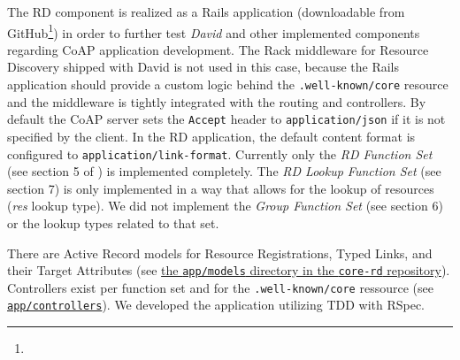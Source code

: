 	The \acl{RD} component is realized as a \ac{Rails} application
	(downloadable from GitHub\footnote{\urlCoreRd}) in order to further test
	\emph{David} and other implemented components regarding \ac{CoAP}
	application development. The Rack middleware for Resource Discovery shipped
	with David is not used in this case, because the \ac{Rails} application
	should provide a custom logic behind the \texttt{.well-known/core} resource
	and the middleware is tightly integrated with the routing and controllers.
	By default the \ac{CoAP} server sets the \texttt{Accept} header to
	\texttt{application/json} if it is not specified by the client. In the
	\ac{RD} application, the default content format is configured to
	\texttt{application/link-format}. Currently only the \emph{\ac{RD} Function
	Set} (see section 5 of \cite{rd}) is implemented completely. The
	\emph{\ac{RD} Lookup Function Set} (see section 7) is only implemented in a
	way that allows for the lookup of resources (\emph{res} lookup type). We
	did not implement the \emph{Group Function Set} (see section 6) or the
	lookup types related to that set.

	There are Active Record models for Resource Registrations, Typed Links, and
	their Target Attributes (see
	\href{https://github.com/nning/core-rd/blob/0.1.0/app/models}{the
	\texttt{app/models} directory in the \texttt{core-rd} repository}).
	Controllers exist per function set and for the \texttt{.well-known/core}
	ressource (see
	\href{https://github.com/nning/core-rd/tree/0.1.0/app/controllers}{\texttt{app/controllers}}).
	We developed the application utilizing \ac{TDD} with RSpec.

